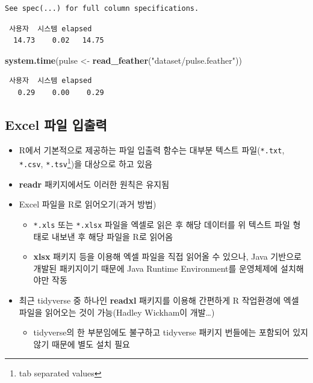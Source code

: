 \documentclass[
  11pt,
]{krantz}
\newenvironment{Shaded}{\begin{snugshade}}{\end{snugshade}}
\newcommand{\KeywordTok}[1]{\textcolor[rgb]{0.27,0.27,0.27}{\textbf{#1}}}
\newcommand{\NormalTok}[1]{#1}
\newcommand{\StringTok}[1]{\textcolor[rgb]{0.5,0.5,0.5}{#1}}
\providecommand{\tightlist}{%
  \setlength{\itemsep}{0pt}\setlength{\parskip}{0pt}}
\begin{document}
\begin{verbatim}
See spec(...) for full column specifications.
\end{verbatim}

\begin{verbatim}
 사용자  시스템 elapsed 
  14.73    0.02   14.75 
\end{verbatim}

\begin{Shaded}
\begin{Highlighting}[]
\KeywordTok{system.time}\NormalTok{(pulse <-}\StringTok{ }\KeywordTok{read_feather}\NormalTok{(}\StringTok{"dataset/pulse.feather"}\NormalTok{))}
\end{Highlighting}
\end{Shaded}

\begin{verbatim}
 사용자  시스템 elapsed 
   0.29    0.00    0.29 
\end{verbatim}

\normalsize

\hypertarget{import-export-excel}{%
\subsection{Excel 파일 입출력}\label{import-export-excel}}

\begin{itemize}
\tightlist
\item
  R에서 기본적으로 제공하는 파일 입출력 함수는 대부분 텍스트 파일(\texttt{*.txt}, \texttt{*.csv}, \texttt{*.tsv}\footnote{tab separated values})을 대상으로 하고 있음
\item
  \textbf{readr} 패키지에서도 이러한 원칙은 유지됨
\item
  Excel 파일을 R로 읽어오기(과거 방법)

  \begin{itemize}
  \tightlist
  \item
    \texttt{*.xls} 또는 \texttt{*.xlsx} 파일을 엑셀로 읽은 후 해당 데이터를 위 텍스트 파일 형태로 내보낸 후 해당 파일을 R로 읽어옴
  \item
    \textbf{xlsx} 패키지 등을 이용해 엑셀 파일을 직접 읽어올 수 있으나, Java 기반으로 개발된 패키지이기 때문에 Java Runtime Environment를 운영체제에 설치해야만 작동
  \end{itemize}
\item
  최근 tidyverse 중 하나인 \textbf{readxl} 패키지를 이용해 간편하게 R 작업환경에 엑셀 파일을 읽어오는 것이 가능(Hadley Wickham이 개발\ldots)

  \begin{itemize}
  \tightlist
  \item
    tidyverse의 한 부분임에도 불구하고 tidyverse 패키지 번들에는 포함되어 있지 않기 때문에 별도 설치 필요
  \end{itemize}
\end{itemize}
\end{document}
